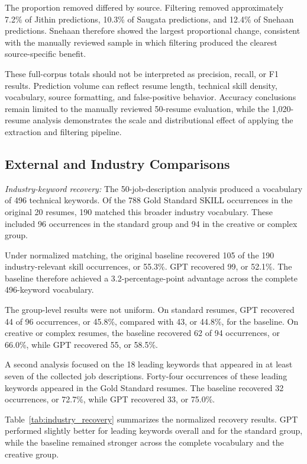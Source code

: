 \documentclass[conference]{IEEEtran}
\begin{document}
The proportion removed differed by source. Filtering removed
approximately 7.2\% of Jithin predictions, 10.3\% of Saugata
predictions, and 12.4\% of Snehaan predictions. Snehaan therefore showed
the largest proportional change, consistent with the manually reviewed
sample in which filtering produced the clearest source-specific benefit.

These full-corpus totals should not be interpreted as precision, recall,
or F1 results. Prediction volume can reflect resume length, technical
skill density, vocabulary, source formatting, and false-positive
behavior. Accuracy conclusions remain limited to the manually reviewed
50-resume evaluation, while the 1,020-resume analysis demonstrates the
scale and distributional effect of applying the extraction and filtering
pipeline.

\subsection{External and Industry Comparisons}

\textit{Industry-keyword recovery:}
The 50-job-description analysis produced a vocabulary of 496 technical
keywords. Of the 788 Gold Standard SKILL occurrences in the original
20 resumes, 190 matched this broader industry vocabulary. These included
96 occurrences in the standard group and 94 in the creative or complex
group.

Under normalized matching, the original baseline recovered 105 of the
190 industry-relevant skill occurrences, or 55.3\%. GPT recovered 99,
or 52.1\%. The baseline therefore achieved a 3.2-percentage-point
advantage across the complete 496-keyword vocabulary.

The group-level results were not uniform. On standard resumes, GPT
recovered 44 of 96 occurrences, or 45.8\%, compared with 43, or 44.8\%,
for the baseline. On creative or complex resumes, the baseline recovered
62 of 94 occurrences, or 66.0\%, while GPT recovered 55, or 58.5\%.

A second analysis focused on the 18 leading keywords that appeared in
at least seven of the collected job descriptions. Forty-four occurrences
of these leading keywords appeared in the Gold Standard resumes. The
baseline recovered 32 occurrences, or 72.7\%, while GPT recovered 33,
or 75.0\%.

Table~\ref{tab:industry_recovery} summarizes the normalized recovery
results. GPT performed slightly better for leading keywords overall and
for the standard group, while the baseline remained stronger across the
complete vocabulary and the creative group.
\end{document}
